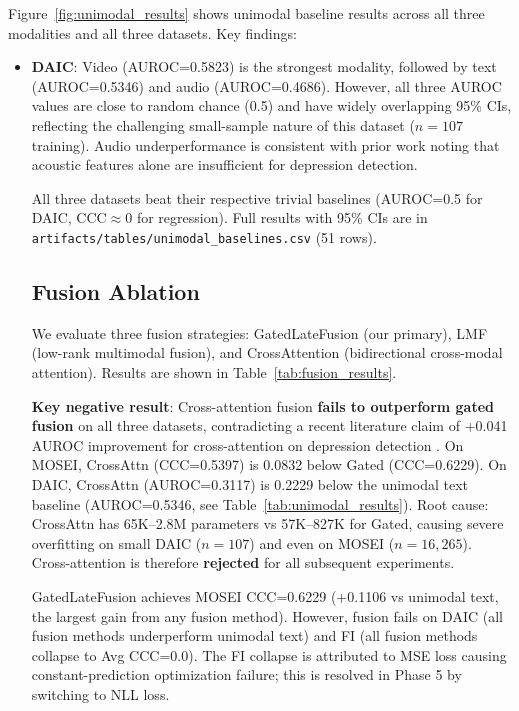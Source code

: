 \documentclass[12pt,oneside]{book}
\begin{document}
Figure~\ref{fig:unimodal_results} shows unimodal baseline results across all three modalities and all three datasets. Key findings:

\begin{itemize}
    \item \textbf{DAIC}: Video (AUROC=0.5823) is the strongest modality, followed by text (AUROC=0.5346) and audio (AUROC=0.4686). However, all three AUROC values are close to random chance (0.5) and have widely overlapping 95\% CIs, reflecting the challenging small-sample nature of this dataset ($n=107$ training). Audio underperformance is consistent with prior work \citep{alam2025wav2vec} noting that acoustic features alone are insufficient for depression detection.

All three datasets beat their respective trivial baselines (AUROC=0.5 for DAIC, CCC$\approx$0 for regression). Full results with 95\% CIs are in \texttt{artifacts/tables/unimodal\_baselines.csv} (51 rows).

\subsection{Fusion Ablation}
\label{sec:fusion_ablation}



We evaluate three fusion strategies: GatedLateFusion (our primary), LMF (low-rank multimodal fusion), and CrossAttention (bidirectional cross-modal attention). Results are shown in Table~\ref{tab:fusion_results}.

\textbf{Key negative result}: Cross-attention fusion \textbf{fails to outperform gated fusion} on all three datasets, contradicting a recent literature claim of +0.041 AUROC improvement for cross-attention on depression detection \citep{kim2024crossmodal}. On MOSEI, CrossAttn (CCC=0.5397) is 0.0832 below Gated (CCC=0.6229). On DAIC, CrossAttn (AUROC=0.3117) is 0.2229 below the unimodal text baseline (AUROC=0.5346, see Table~\ref{tab:unimodal_results}). Root cause: CrossAttn has 65K--2.8M parameters vs 57K--827K for Gated, causing severe overfitting on small DAIC ($n=107$) and even on MOSEI ($n=16{,}265$). Cross-attention is therefore \textbf{rejected} for all subsequent experiments.

GatedLateFusion achieves MOSEI CCC=0.6229 (+0.1106 vs unimodal text, the largest gain from any fusion method). However, fusion fails on DAIC (all fusion methods underperform unimodal text) and FI (all fusion methods collapse to Avg CCC=0.0). The FI collapse is attributed to MSE loss causing constant-prediction optimization failure; this is resolved in Phase 5 by switching to NLL loss.


\end{itemize}
\end{document}

